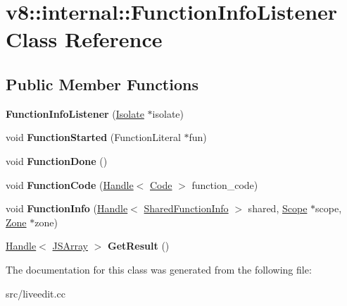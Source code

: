 \hypertarget{classv8_1_1internal_1_1_function_info_listener}{}\section{v8\+:\+:internal\+:\+:Function\+Info\+Listener Class Reference}
\label{classv8_1_1internal_1_1_function_info_listener}
\subsection*{Public Member Functions}
\begin{DoxyCompactItemize}
\item 
\hypertarget{classv8_1_1internal_1_1_function_info_listener_a49e145893a837c2421a322ca4b24fad4}{}{\bfseries Function\+Info\+Listener} (\hyperlink{classv8_1_1internal_1_1_isolate}{Isolate} $\ast$isolate)\label{classv8_1_1internal_1_1_function_info_listener_a49e145893a837c2421a322ca4b24fad4}

\item 
\hypertarget{classv8_1_1internal_1_1_function_info_listener_ad162ca599f015e500f6e84abc62709ef}{}void {\bfseries Function\+Started} (Function\+Literal $\ast$fun)\label{classv8_1_1internal_1_1_function_info_listener_ad162ca599f015e500f6e84abc62709ef}

\item 
\hypertarget{classv8_1_1internal_1_1_function_info_listener_ae1d65a484f3133c2c12ff9b789451245}{}void {\bfseries Function\+Done} ()\label{classv8_1_1internal_1_1_function_info_listener_ae1d65a484f3133c2c12ff9b789451245}

\item 
\hypertarget{classv8_1_1internal_1_1_function_info_listener_a4e311972395ad66d20c1679fd4fc9375}{}void {\bfseries Function\+Code} (\hyperlink{classv8_1_1internal_1_1_handle}{Handle}$<$ \hyperlink{classv8_1_1internal_1_1_code}{Code} $>$ function\+\_\+code)\label{classv8_1_1internal_1_1_function_info_listener_a4e311972395ad66d20c1679fd4fc9375}

\item 
\hypertarget{classv8_1_1internal_1_1_function_info_listener_a3eb9b56c0e96d996e68426593cae1e7a}{}void {\bfseries Function\+Info} (\hyperlink{classv8_1_1internal_1_1_handle}{Handle}$<$ \hyperlink{classv8_1_1internal_1_1_shared_function_info}{Shared\+Function\+Info} $>$ shared, \hyperlink{classv8_1_1internal_1_1_scope}{Scope} $\ast$scope, \hyperlink{classv8_1_1internal_1_1_zone}{Zone} $\ast$zone)\label{classv8_1_1internal_1_1_function_info_listener_a3eb9b56c0e96d996e68426593cae1e7a}

\item 
\hypertarget{classv8_1_1internal_1_1_function_info_listener_afd115427969fa4f177873046b0d8708f}{}\hyperlink{classv8_1_1internal_1_1_handle}{Handle}$<$ \hyperlink{classv8_1_1internal_1_1_j_s_array}{J\+S\+Array} $>$ {\bfseries Get\+Result} ()\label{classv8_1_1internal_1_1_function_info_listener_afd115427969fa4f177873046b0d8708f}

\end{DoxyCompactItemize}


The documentation for this class was generated from the following file\+:\begin{DoxyCompactItemize}
\item 
src/liveedit.\+cc\end{DoxyCompactItemize}
